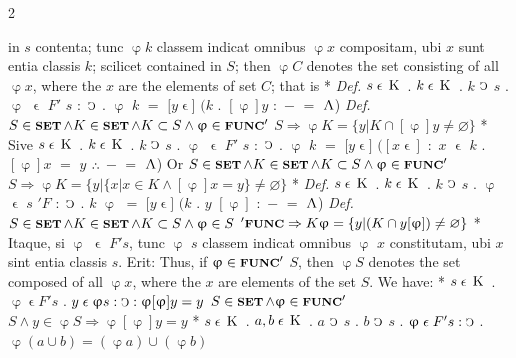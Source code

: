 \documentclass{book}
\newcommand{\C}{\mathop{\sbox0{$\displaystyle$$\reflectbox{C}$} %
\raisebox{-\height+\ht0-0.05cm}[\ht0][\dp0]{\scalebox{0.8}[0.8]{\copy0}}}\displaylimits} %
\newcommand{\pppNoSpace}{\leavevmode\lower0ex\hbox{.}\kern-0.1em\raise0.7ex\hbox{.}\kern-0.1em\lower0ex\hbox{.}} %
\newcommand{\abs}{\mathop{\rotatebox[origin=c]{180}{V}}}
\newcommand{\smallIn}{\ensuremath{\mathrel{\epsilon}}}
\newcommand{\K}{\mathop{\thinspace \text{K} \thinspace}}
\newcommand{\setOfSets}{\mathop{\text{{\footnotesize \textbf{SET}}}}}
\newcommand{\func}{\mathord{\text{{\footnotesize \textbf{FUNC}}}}}
\renewcommand{\rightarrow}{\Rightarrow}
\newenvironment{translateTwoCol}
               { %
                 \columnratio{0.5, 0.5}
                 \begin{paracol}{2}
                 \newcommand{\LAT}{\switchcolumn[0]*}
                 \newcommand{\ENG}{\switchcolumn[1]}
               }
               { %
                 \let\ENG\undefined
                 \let\LAT\undefined
                 \end{paracol}
               }
\begin{document}
\begin{translateTwoCol}
in $s$ contenta; tunc $\upvarphi k$ classem indicat omnibus $\upvarphi x$ compositam, ubi $x$ sunt entia classis $k$; scilicet
\ENG
contained in $S$; then $\upvarphi C$ denotes the set consisting of all $\upvarphi x$, where the $x$ are the elements of set $C$; that is
\LAT
\emph{Def.} \hspace{0.25cm} $s \smallIn \K$ $.$ $k \smallIn \K$ $.$ $k$ $\C$ $s$ $.$ $\upvarphi$ $\smallIn$ $F'$ $s$ $:$ $\C$ $.$ $\upvarphi$ $k$ $=$ $[y $\smallIn$]$ $(k$ $.$ $[\upvarphi]y$ $:$ $-$ $=$ $\abs$)
\ENG
\emph{Def.} \hspace{0.25cm} $S \in \setOfSets \wedge K \in \setOfSets \wedge K \subset S \wedge \upvarphi \in \func'$ $S \rightarrow \upvarphi K = \{ y | K \cap [\upvarphi]y \neq \varnothing \}$
\LAT
Sive \hspace{0.25cm} $s \smallIn \K$ $.$ $k \smallIn \K$ $.$ $k$ $\C$ $s$ $.$ $\upvarphi$ $\smallIn$ $F'$ $s$ $:$ $\C$ $.$ $\upvarphi$ $k$ $=$ $[y $\smallIn$]$ $([x\smallIn]$ $:$ $x$ $\smallIn$ $k$ $.$ $[\upvarphi]x$ $=$ $y$ $\pppNoSpace$ $-$ $=$ $\abs$)
\ENG
Or \hspace{0.25cm} $S \in \setOfSets \wedge K \in \setOfSets \wedge K \subset S \wedge \upvarphi \in \func'$ $S \rightarrow \upvarphi K = \{ y | \{ x | x \in K \wedge [\upvarphi]x = y \} \neq \varnothing \}$
\LAT
\emph{Def.} \hspace{0.25cm} $s \smallIn \K$ $.$ $k \smallIn \K$ $.$ $k$ $\C$ $s$ $.$ $\upvarphi$ $\smallIn$ $s$ $'F$ $:$ $\C$ $.$ $k$ $\upvarphi$ $=$ $[y $\smallIn$]$ $(k$ $.$ $y$ $[\upvarphi]$ $:$ $-$ $=$ $\abs$)
\ENG
\emph{Def.} \hspace{0.25cm} $S \in \setOfSets \wedge K \in \setOfSets \wedge K \subset S \wedge \upvarphi \in S$ $'\func \rightarrow K \upvarphi = \{ y | (K \cap y [\upvarphi]) \neq \varnothing \}$
\LAT
Itaque, si $\upvarphi$ $\smallIn$ $F' s$, tunc $\upvarphi$ $s$ classem indicat omnibus $\upvarphi$ $x$ constitutam, ubi $x$ sint entia classis $s$. Erit:
\ENG
Thus, if $\upvarphi \in \func'$ $S$, then $\upvarphi S$ denotes the set composed of all $\upvarphi x$, where the $x$ are elements of the set $S$. We have:
\LAT
\hspace{1.06cm} $s \smallIn \K$ . $\upvarphi \smallIn F' s$ . $y \smallIn \upvarphi s : \C : \upvarphi [\upvarphi] y = y$
\ENG
\hspace{1.06cm} $S \in \setOfSets \wedge \upvarphi \in \func'$ $S \wedge y \in \upvarphi S \rightarrow \upvarphi [\upvarphi] y = y$
\LAT
\hspace{1.06cm} $s \smallIn \K$ . $a, b \smallIn \K$ . $a$ $\C$ $s$ . $b$ $\C$ $s$ . $\upvarphi \smallIn F' s : \C$ . $\upvarphi (a \cup b) = (\upvarphi a) \cup (\upvarphi b)$

\end{translateTwoCol}
\end{document}
